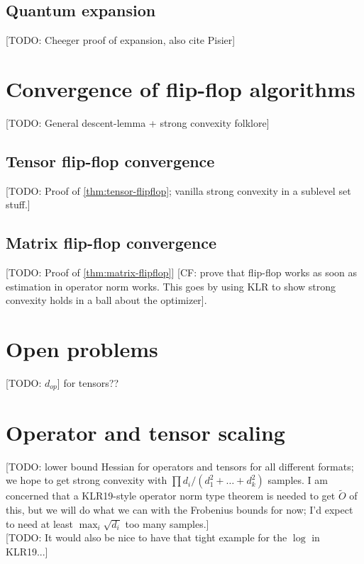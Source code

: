 \documentclass{article}
\newcommand{\CF}[1]{{\color{purple}[CF: #1]}}
\newcommand{\TODO}[1]{{\color{blue}[TODO: #1]}}
\begin{document}
\subsection{Quantum expansion}
\TODO{Cheeger proof of expansion, also cite Pisier}

\section{Convergence of flip-flop algorithms}
\TODO{General descent-lemma + strong convexity folklore}
\subsection{Tensor flip-flop convergence}
\TODO{Proof of \cref{thm:tensor-flipflop}; vanilla strong convexity in a sublevel set stuff.}
\subsection{Matrix flip-flop convergence}
\TODO{Proof of \cref{thm:matrix-flipflop}}
\CF{prove that flip-flop works as soon as estimation in operator norm works. This goes by using KLR to show strong convexity holds in a ball about the optimizer}.









\section{Open problems}
\TODO{$d_{op}$} for tensors??








\appendix 




\section{Operator and tensor scaling}\label{sec:scaling}
\TODO{lower bound Hessian for operators and tensors for all different formats; we hope to get strong convexity with $\prod d_i /(d_1^2 + \dots + d_k^2)$ samples. I am concerned that a KLR19-style operator norm type theorem is needed to get $\tilde{O}$ of this, but we will do what we can with the Frobenius bounds for now; I'd expect to need at least $\max_i \sqrt{d_i}$ too many samples.}\\
\TODO{It would also be nice to have that tight example for the $\log$ in KLR19...}
\end{document}
